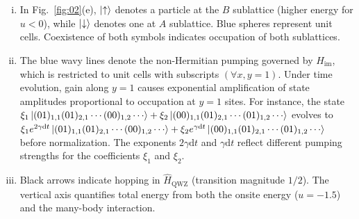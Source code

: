 \documentclass[longbibliography, aps, prx, amsmath, amssymb, amsfonts, twocolumn,superscriptaddress, footinbib]{revtex4-1}
\begin{document}
	\begin{enumerate}[(i)]
		\item {
		In Fig.~\ref{fig:02}(e), $\ket{\uparrow}$ denotes a particle at the 
		$B$ sublattice (higher energy for $u<0$), while $\ket{\downarrow}$ denotes 
		one at $A$ sublattice. Blue spheres represent unit cells. Coexistence of 
		both symbols indicates occupation of both sublattices.
		}
		\item The blue wavy lines denote the non-Hermitian pumping governed by $\hat{H}_{\text{im}}$, which is restricted to unit cells with subscripts $(\forall x,y=1)$. 
		{
		Under time evolution, gain along $y=1$ causes exponential amplification 
		of state amplitudes proportional to occupation at $y=1$ sites.
		For instance, the state $\xi_1 \ket{(01)_{1,1}(01)_{2,1}\cdots(00)_{1,2}\cdots} + \xi_2\ket{(00)_{1,1}(01)_{2,1}\cdots(01)_{1,2}\cdots}$ evolves to $\xi_1 e^{2\gamma \mathrm{d}t} \ket{(01)_{1,1}(01)_{2,1}\cdots(00)_{1,2}\cdots} + \xi_2 e^{\gamma \mathrm{d}t} \ket{(00)_{1,1}(01)_{2,1}\cdots(01)_{1,2}\cdots}$ before normalization. The exponents $2\gamma \mathrm{d}t$ and $\gamma \mathrm{d}t$ reflect different pumping strengths for the coefficients $\xi_1$ and $\xi_2$. 
		}
		\item {Black arrows indicate hopping in $\hat{H}_{\text{QWZ}}$ (transition magnitude $1/2$). The vertical axis quantifies total energy from both the onsite energy ($u=-1.5$) and the many-body interaction.}
	\end{enumerate}
\end{document}
